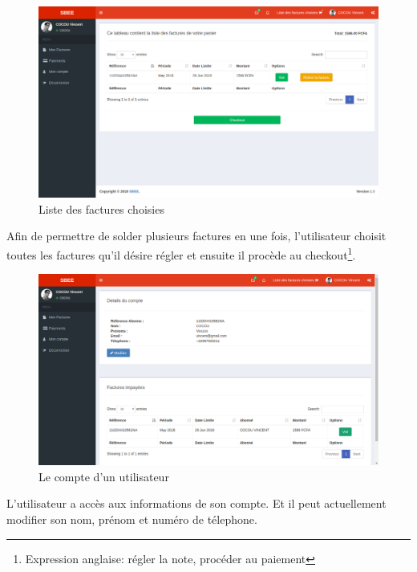 	  \begin{figure}[H]
	      \begin{center}
		  \includegraphics[scale=0.35]{images/choix.png}
	      \end{center}
	      \caption{Liste des factures choisies}
	      \label{Page de la whitelist Port}
	  \end{figure}
	  Afin de permettre de solder plusieurs factures en une fois, l'utilisateur choisit toutes les factures qu'il d\'esire r\'egler et ensuite il proc\`ede au checkout\footnote{Expression anglaise: régler la note, proc\'eder au paiement}.
			      
	  \begin{figure}[H]
	      \begin{center}
		  \includegraphics[scale=0.35]{images/detailcompte.png}
	      \end{center}
	      \caption{Le compte d'un utilisateur}
	      \label{Page de la whitelist Port}
	  \end{figure}
	  L'utilisateur a acc\`es aux informations de son compte. Et il peut actuellement modifier son nom, pr\'enom et num\'ero de t\'elephone.
		
